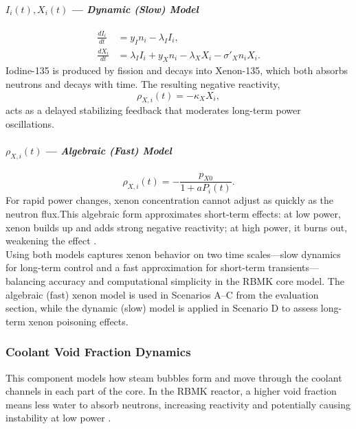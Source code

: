\documentclass[11pt]{article}
\begin{document}
\paragraph{\textbf{$I_i(t), X_i(t)$ --- \textit{Dynamic (Slow) Model}}}
\begin{align}
\frac{dI_i}{dt} &= y_I n_i - \lambda_I I_i, \\[4pt]
\frac{dX_i}{dt} &= \lambda_I I_i + y_X n_i - \lambda_X X_i - \sigma'_X n_i X_i.
\end{align}
Iodine-135 is produced by fission and decays into Xenon-135, which both absorbs neutrons and decays with time. The resulting negative reactivity,
\[
\rho_{X,i}(t) = -\kappa_X X_i,
\]
acts as a delayed stabilizing feedback that moderates long-term power oscillations.

\paragraph{\textbf{$\rho_{X,i}(t)$ --- \textit{Algebraic (Fast) Model}}}
\begin{equation}
\rho_{X,i}(t) = -\frac{p_{X0}}{1 + a P_i(t)}.
\end{equation}
For rapid power changes, xenon concentration cannot adjust as quickly as the neutron flux.This algebraic form approximates short-term effects: at low power, xenon builds up and adds strong negative reactivity; at high power, it burns out, weakening the effect \cite{Lewis2008,NP_Xenon}.\\

Using both models captures xenon behavior on two time scales---slow dynamics for long-term control and a fast approximation for short-term transients---balancing accuracy and computational simplicity in the RBMK core model. The algebraic (fast) xenon model is used in Scenarios A--C from the evaluation section, while the dynamic (slow) model is applied in Scenario D to assess long-term xenon poisoning effects.

\subsubsection{Coolant Void Fraction Dynamics}
This component models how steam bubbles form and move through the coolant channels in each part of the core. In the RBMK reactor, a higher void fraction means less water to absorb neutrons, increasing reactivity and potentially causing instability at low power \cite{INSAG7,Stacey2007,WNA_RBMK}.
\end{document}

